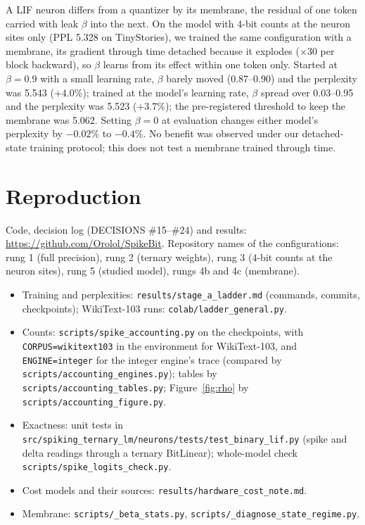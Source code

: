 \documentclass[11pt]{article}
\newcommand{\x}{$\times$}
\begin{document}
A LIF neuron differs from a quantizer by its membrane, the residual of one token carried with
leak $\beta$ into the next. On the model with 4-bit counts at the neuron sites only (PPL 5.328 on
TinyStories), we trained the same configuration with a membrane, its gradient through time
detached because it explodes (\x30 per block backward), so $\beta$ learns from its effect within
one token only. Started at $\beta = 0.9$ with a small learning rate, $\beta$ barely moved
(0.87--0.90) and the perplexity was 5.543 ($+4.0\%$); trained at the model's learning rate,
$\beta$ spread over 0.03--0.95 and the perplexity was 5.523 ($+3.7\%$); the pre-registered
threshold to keep the membrane was 5.062. Setting $\beta = 0$ at evaluation changes either
model's perplexity by $-0.02\%$ to $-0.4\%$. No benefit was observed under our detached-state
training protocol; this does not test a membrane trained through time.

\section{Reproduction}
\label{app:repro}

Code, decision log (DECISIONS \#15--\#24) and results:
\url{https://github.com/Orolol/SpikeBit}. Repository names
of the configurations: rung 1 (full precision), rung 2 (ternary weights), rung 3 (4-bit counts
at the neuron sites), rung 5 (studied model), rungs 4b and 4c (membrane).
\begin{itemize}
\item Training and perplexities: \nolinkurl{results/stage_a_ladder.md} (commands, commits,
  checkpoints); WikiText-103 runs: \nolinkurl{colab/ladder_general.py}.
\item Counts: \nolinkurl{scripts/spike_accounting.py} on the checkpoints, with
  \texttt{CORPUS=wikitext103} in the environment for WikiText-103, and \texttt{ENGINE=integer}
  for the integer engine's trace (compared by \nolinkurl{scripts/accounting_engines.py}); tables by
  \nolinkurl{scripts/accounting_tables.py}; Figure~\ref{fig:rho} by
  \nolinkurl{scripts/accounting_figure.py}.
\item Exactness: unit tests in \nolinkurl{src/spiking_ternary_lm/neurons/tests/test_binary_lif.py}
  (spike and delta readings through a ternary BitLinear); whole-model check
  \nolinkurl{scripts/spike_logits_check.py}.
\item Cost models and their sources: \nolinkurl{results/hardware_cost_note.md}.
\item Membrane: \nolinkurl{scripts/_beta_stats.py}, \nolinkurl{scripts/_diagnose_state_regime.py}.
\end{itemize}



\end{document}
